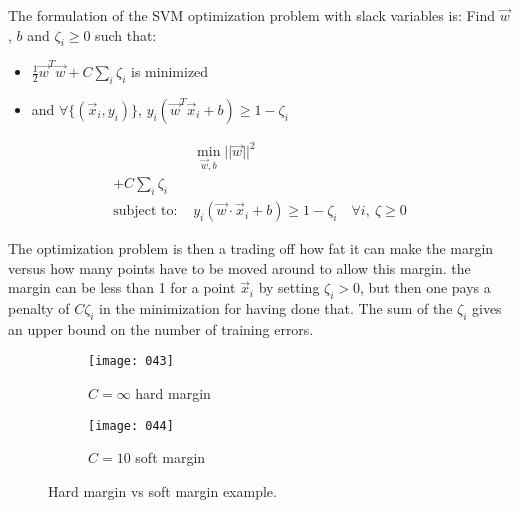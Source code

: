 The formulation of the SVM optimization problem with slack variables is: Find \(\vec{w}\), \(b\) and \(\zeta_i \geq 0\) such that:
\begin{itemize}
    \item
    \(\frac 1 2 \vec{w}^T \vec{w} + C \sum_i \zeta_i\) is minimized
    \item
    and \(\forall \{(\vec{x}_i, y_i)\}\), \(y_i(\vec{w}^T \vec{x}_i + b) \geq 1 - \zeta_i\)
\end{itemize}
\begin{align*}
    &\min_{\vec{w},b} ||\vec{w}||^2\\ + C \sum_i \zeta_i\\
    \text{subject to: } &y_i(\vec{w} \cdot \vec{x}_i + b) \geq 1 - \zeta_i \quad \forall i,\ \zeta \geq 0
\end{align*}

The optimization problem is then a trading off how fat it can make the margin versus how many points have to be moved around to allow this margin. the margin can be less than 1 for a point \(\vec{x}_i\) by setting \(\zeta_i > 0\), but then one pays a penalty of \(C\zeta_i\) in the minimization for having done that. The sum of the \(\zeta_i\) gives an upper bound on the number of training errors.

\begin{figure}[h!]
    \centering
    \begin{subfigure}{.4\textwidth}
        \centering
        \texttt{[image: 043]}
        \caption{\(C = \infty\) hard margin}
    \end{subfigure}
    \begin{subfigure}{.4\textwidth}
        \centering
        \texttt{[image: 044]}
        \caption{\(C=10\) soft margin}
    \end{subfigure}
    \caption{Hard margin vs soft margin example.}
\end{figure}

